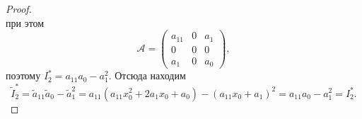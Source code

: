 \begin{proof}
$$    $$
    при этом 
    $$
    \mathcal{A} =
    \begin{pmatrix}
        a_{11} & 0 & a_1\\
        0 & 0 & 0\\
        a_1 & 0 & a_0
    \end{pmatrix},
    $$
    поэтому $I_2^\ast = a_{11}a_0 - a_1^2$. Отсюда находим
    $$
    \widetilde{I}_2^\ast = \widetilde{a}_{11}\widetilde{a}_0 - \widetilde{a}_1^2 = a_{11}(a_{11}x_0^2 + 2a_1x_0 + a_0) - (a_{11}x_0 + a_1)^2 = a_{11}a_0 - a_1^2 = I_2^\ast.
    $$
\end{proof}


